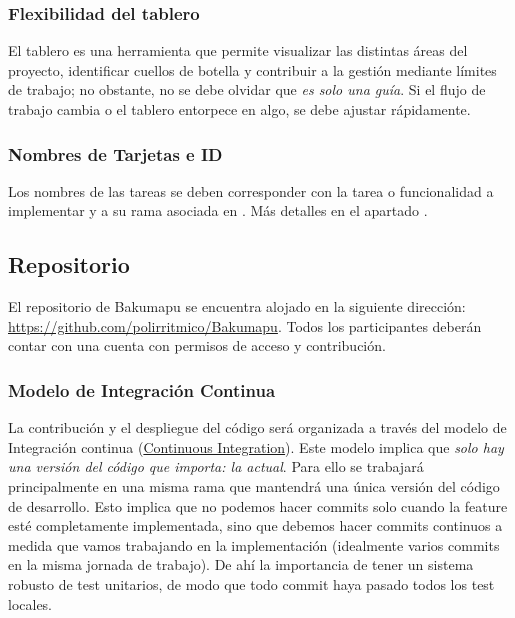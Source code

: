 \subsubsection{Flexibilidad del tablero}\label{flujo:flexibilidad}
El tablero es una herramienta que permite visualizar las distintas áreas del proyecto, identificar cuellos de botella y contribuir a la gestión mediante límites de trabajo; no obstante, no se debe olvidar que \emph{es solo una guía}. Si el flujo de trabajo cambia o el tablero entorpece en algo, se debe ajustar rápidamente.

\subsubsection{Nombres de Tarjetas e ID}\label{flujo:nombres-de-tarjetas}
Los nombres de las tareas se deben corresponder con la tarea o funcionalidad a implementar y a su rama asociada en . Más detalles en el apartado .


\subsection{Repositorio}\label{flujo:repositorio}
El repositorio  de Bakumapu se encuentra alojado en la siguiente dirección: \url{https://github.com/polirritmico/Bakumapu}. Todos los participantes deberán contar con una cuenta con permisos de acceso y contribución.

\subsubsection{Modelo de Integración Continua}\label{flujo:modelo-de-ramas}
La contribución y el despliegue del código será organizada a través del modelo de Integración continua (\href{https://en.wikipedia.org/wiki/Continuous_integration}{Continuous Integration}). Este modelo implica que \emph{solo hay una versión del código que importa: la actual}. Para ello se trabajará principalmente en una misma rama que mantendrá una única versión del código de desarrollo. Esto implica que no podemos hacer commits solo cuando la feature esté completamente implementada, sino que debemos hacer commits continuos a medida que vamos trabajando en la implementación (idealmente varios commits en la misma jornada de trabajo). De ahí la importancia de tener un sistema robusto de test unitarios, de modo que todo commit haya pasado todos los test locales.

